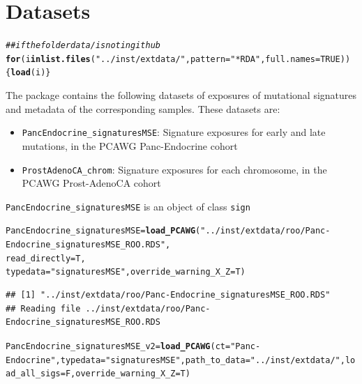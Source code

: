 \documentclass{article}\usepackage[]{graphicx}\usepackage[]{xcolor}
\makeatletter
\newcommand{\hlnum}[1]{\textcolor[rgb]{0.686,0.059,0.569}{#1}}%
\newcommand{\hlstr}[1]{\textcolor[rgb]{0.192,0.494,0.8}{#1}}%
\newcommand{\hlcom}[1]{\textcolor[rgb]{0.678,0.584,0.686}{\textit{#1}}}%
\newcommand{\hlstd}[1]{\textcolor[rgb]{0.345,0.345,0.345}{#1}}%
\newcommand{\hlkwa}[1]{\textcolor[rgb]{0.161,0.373,0.58}{\textbf{#1}}}%
\newcommand{\hlkwb}[1]{\textcolor[rgb]{0.69,0.353,0.396}{#1}}%
\newcommand{\hlkwc}[1]{\textcolor[rgb]{0.333,0.667,0.333}{#1}}%
\newcommand{\hlkwd}[1]{\textcolor[rgb]{0.737,0.353,0.396}{\textbf{#1}}}%
\newenvironment{kframe}{%
 \def\at@end@of@kframe{}%
 \ifinner\ifhmode%
  \def\at@end@of@kframe{\end{minipage}}%
  \begin{minipage}{\columnwidth}%
 \fi\fi%
 \def\FrameCommand##1{\hskip\@totalleftmargin \hskip-\fboxsep
 \colorbox{shadecolor}{##1}\hskip-\fboxsep
     \hskip-\linewidth \hskip-\@totalleftmargin \hskip\columnwidth}%
 \MakeFramed {\advance\hsize-\width
   \@totalleftmargin\z@ \linewidth\hsize
   \@setminipage}}%
 {\par\unskip\endMakeFramed%
 \at@end@of@kframe}
\newenvironment{knitrout}{}{} %
\makeatother
\begin{document}
\section{Datasets}
\begin{knitrout}
\color{fgcolor}\begin{kframe}
\begin{alltt}
\hlcom{## if the folder data/ is not in github}
\hlkwa{for}\hlstd{(i} \hlkwa{in} \hlkwd{list.files}\hlstd{(}\hlstr{"../inst/extdata/"}\hlstd{,} \hlkwc{pattern} \hlstd{=} \hlstr{"*RDA"}\hlstd{,} \hlkwc{full.names} \hlstd{=} \hlnum{TRUE}\hlstd{))\{}\hlkwd{load}\hlstd{(i)\}}
\end{alltt}
\end{kframe}
\end{knitrout}

The package contains the following datasets of exposures of mutational signatures and metadata of the corresponding samples. These datasets are:
\begin{itemize}
\item \verb|PancEndocrine_signaturesMSE|: Signature exposures for early and late mutations, in the PCAWG Panc-Endocrine cohort
\item  \verb|ProstAdenoCA_chrom|: Signature exposures for each chromosome, in the PCAWG Prost-AdenoCA cohort
\end{itemize}

\verb|PancEndocrine_signaturesMSE| is an object of class \verb|sign|

\begin{knitrout}
\color{fgcolor}\begin{kframe}
\begin{alltt}
\hlstd{PancEndocrine_signaturesMSE} \hlkwb{=} \hlkwd{load_PCAWG}\hlstd{(}\hlstr{"../inst/extdata/roo/Panc-Endocrine_signaturesMSE_ROO.RDS"}\hlstd{,}
                                         \hlkwc{read_directly} \hlstd{= T,}
                                         \hlkwc{typedata} \hlstd{=} \hlstr{"signaturesMSE"}\hlstd{,} \hlkwc{override_warning_X_Z} \hlstd{= T)}
\end{alltt}
\begin{verbatim}
## [1] "../inst/extdata/roo/Panc-Endocrine_signaturesMSE_ROO.RDS"
## Reading file ../inst/extdata/roo/Panc-Endocrine_signaturesMSE_ROO.RDS
\end{verbatim}
\begin{alltt}
\hlstd{PancEndocrine_signaturesMSE_v2} \hlkwb{=} \hlkwd{load_PCAWG}\hlstd{(}\hlkwc{ct} \hlstd{=} \hlstr{"Panc-Endocrine"}\hlstd{,} \hlkwc{typedata} \hlstd{=} \hlstr{"signaturesMSE"}\hlstd{,} \hlkwc{path_to_data} \hlstd{=} \hlstr{"../inst/extdata/"}\hlstd{,} \hlkwc{load_all_sigs} \hlstd{= F,} \hlkwc{override_warning_X_Z} \hlstd{= T)}
\end{alltt}
\end{kframe}
\end{knitrout}
\end{document}
